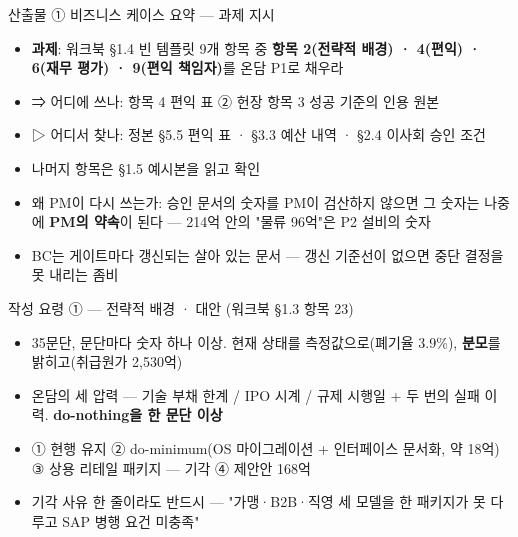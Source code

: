 \begin{frame}{산출물 ① 비즈니스 케이스 요약 — 과제 지시}
\begin{itemize}
\item \textbf{과제}: 워크북 §1.4 빈 템플릿 9개 항목 중 \textbf{항목 2(전략적 배경) · 4(편익) · 6(재무 평가) · 9(편익 책임자)}를 온담 P1로 채우라
\item {\footnotesize ⇒ 어디에 쓰나: 항목 4 편익 표 \ra{} ② 헌장 항목 3 성공 기준의 인용 원본}
\item {\footnotesize ▷ 어디서 찾나: 정본 §5.5 편익 표 · §3.3 예산 내역 · §2.4 이사회 승인 조건}
\item 나머지 항목은 §1.5 예시본을 읽고 확인
\item 왜 PM이 다시 쓰는가: 승인 문서의 숫자를 PM이 검산하지 않으면 그 숫자는 나중에 \textbf{PM의 약속}이 된다 — 214억 안의 "물류 96억"은 P2 설비의 숫자
\item BC는 게이트마다 갱신되는 살아 있는 문서 — 갱신 기준선이 없으면 중단 결정을 못 내리는 좀비
\end{itemize}
\end{frame}

\begin{frame}{작성 요령 ① — 전략적 배경 · 대안 (워크북 §1.3 항목 2\til{}3)}
\begin{itemize}
\item 3\til{}5문단, 문단마다 숫자 하나 이상. 현재 상태를 측정값으로(폐기율 3.9\%), \textbf{분모}를 밝히고(취급원가 2,530억)
\item 온담의 세 압력 — 기술 부채 한계 / IPO 시계 / 규제 시행일 + 두 번의 실패 이력. \textbf{do-nothing을 한 문단 이상}
\end{itemize}
\begin{itemize}
\item ① 현행 유지 ② do-minimum(OS 마이그레이션 + 인터페이스 문서화, 약 18억) ③ 상용 리테일 패키지 — 기각 ④ 제안안 168억
\item 기각 사유 한 줄이라도 반드시 — "가맹·B2B·직영 세 모델을 한 패키지가 못 다루고 SAP 병행 요건 미충족"
\end{itemize}
\end{frame}

